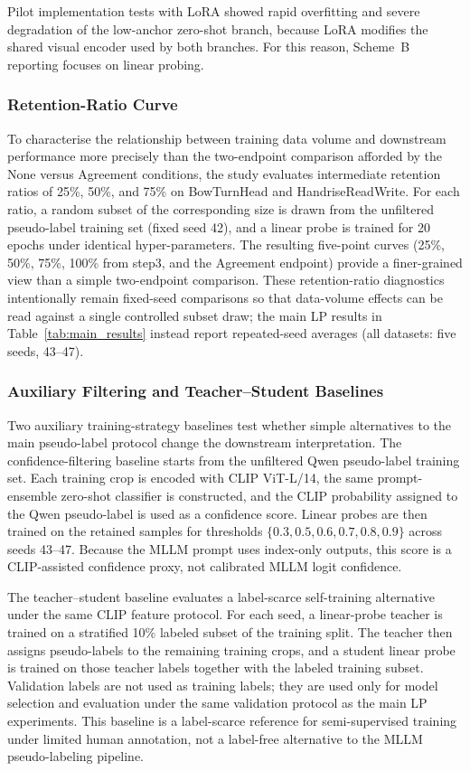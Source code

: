 \documentclass{ieeeaccess}
\begin{document}
Pilot implementation tests with LoRA showed rapid overfitting and
severe degradation of the low-anchor zero-shot branch, because LoRA
modifies the shared visual encoder used by both branches.
For this reason, Scheme~B reporting focuses on linear probing.

\subsubsection{Retention-Ratio Curve}

To characterise the relationship between training data volume and
downstream performance more precisely than the two-endpoint comparison
afforded by the None versus Agreement conditions, the study evaluates
intermediate retention ratios of 25\%, 50\%, and 75\% on BowTurnHead
and HandriseReadWrite.
For each ratio, a random subset of the corresponding size is drawn
from the unfiltered pseudo-label training set (fixed seed 42), and
a linear probe is trained for 20 epochs under identical hyper-parameters.
The resulting five-point curves (25\%, 50\%, 75\%, 100\% from step3,
and the Agreement endpoint) provide a finer-grained view than a simple
two-endpoint comparison. These retention-ratio diagnostics intentionally
remain fixed-seed comparisons so that data-volume effects can be read
against a single controlled subset draw; the main LP results in
Table~\ref{tab:main_results} instead report repeated-seed averages
(all datasets: five seeds, 43--47).

\subsubsection{Auxiliary Filtering and Teacher--Student Baselines}

Two auxiliary training-strategy baselines test whether simple
alternatives to the main pseudo-label protocol change the downstream
interpretation. The confidence-filtering baseline starts from the
unfiltered Qwen pseudo-label training set. Each training crop is encoded
with CLIP ViT-L/14, the same prompt-ensemble zero-shot classifier is
constructed, and the CLIP probability assigned to the Qwen pseudo-label
is used as a confidence score. Linear probes are then trained on the
retained samples for thresholds $\{0.3,0.5,0.6,0.7,0.8,0.9\}$ across
seeds 43--47. Because the MLLM prompt uses index-only outputs, this
score is a CLIP-assisted confidence proxy, not calibrated MLLM logit
confidence.

The teacher--student baseline evaluates a label-scarce self-training
alternative under the same CLIP feature protocol. For each seed, a
linear-probe teacher is trained on a stratified 10\% labeled subset of
the training split. The teacher then assigns pseudo-labels to the
remaining training crops, and a student linear probe is trained on those
teacher labels together with the labeled training subset. Validation
labels are not used as training labels; they are used only for model
selection and evaluation under the same validation protocol as the main
LP experiments. This baseline is a label-scarce reference for
semi-supervised training under limited human annotation, not a label-free
alternative to the MLLM pseudo-labeling pipeline.
\end{document}
